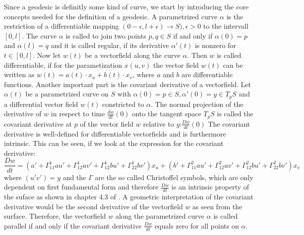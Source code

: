 Since a geodesic is definitly some kind of curve, we start by introducing the core concepts needed for the definition of a geodesic.
A parametrized curve $\alpha$ is the restriction of a differentiable mapping $( 0-\epsilon, l+\epsilon) \rightarrow S), \epsilon > 0$ to the intervall $[0,l]$.
The curve $\alpha$ is called to join two points $p,q \in S$ if and only if $\alpha(0) = p$ and $\alpha(l) = q$ and it is called regular, if its derivative $\alpha'(t)$ is nonzero for $t \in [0,l]$.
Now let $w(t)$ be a vectorfield along the curve $\alpha$.
Then $w$ is called differentiable, if for the parametization $x(u,v)$ the vector field $w(t)$ can be written as $w(t) = a(t) \cdot x_u + b(t) \cdot x_v$, where $a$ and $b$ are differentiable functions.
Another important part is the covariant derivative of a vectorfield.
Let $\alpha(t)$ be a parametrized curve on $S$ with $\alpha(0) = p \in S, \alpha'(0) = y \in T_pS$ and a differential vector field $w(t)$ constricted to $\alpha$.
The normal projection of the derivative of $w$ in respect to time $\frac{dw}{dt}(0)$ onto the tangent space $T_pS$ is called the covariant derivative at $p$ of the vector field $w$ relative to $y$:$\frac{Dw}{dt}(0)$
The covariant derivative is well-defined for differentiable vectorfields and is furthermore intrinsic.
This can be seen, if we look at the expression for the covariant derivative:
$$\frac{Dw}{dt} = (a' + \Gamma^{1}_{1 1} a u' + \Gamma^{1}_{1 2} a v' + \Gamma^{1}_{1 2} b u' + \Gamma^{1}_{2 2} b v')x_u + (b' + \Gamma^{2}_{1 1} a u' + \Gamma^{2}_{1 2} a v' + \Gamma^{2}_{1 2} b u' + \Gamma^{2}_{2 2} b v')x_v$$
where $(u' v') = y$  and the $\Gamma$ are the so called Christoffel symbols, which are only dependent on first fundamental form and therefore $\frac{Dw}{dt}$ is an intrinsic property of the suface as shown in chapter 4.3 of \cite{do1976differential}.
A geometric interpretation of the covariant derivative would be the second derivative of the vectorfield $w$ as seen from the surface.
Therefore, the vectorfield $w$ along the parametrized curve $\alpha$ is called parallel if and only if the covariant derivative $\frac{Dw}{dt}$ equals zero for all points on $\alpha$.

